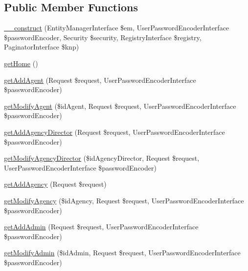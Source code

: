 \subsection*{Public Member Functions}
\begin{DoxyCompactItemize}
\item 
\mbox{\hyperlink{class_app_1_1_controller_1_1_back_office_controller_a6d26388f23c19aa542ee973f05763cd3}{\+\_\+\+\_\+construct}} (Entity\+Manager\+Interface \$em, User\+Password\+Encoder\+Interface \$password\+Encoder, Security \$security, Registry\+Interface \$registry, Paginator\+Interface \$knp)
\item 
\mbox{\hyperlink{class_app_1_1_controller_1_1_back_office_controller_aaff2f32ce95b0fc779c6bf0a4cb951de}{get\+Home}} ()
\item 
\mbox{\hyperlink{class_app_1_1_controller_1_1_back_office_controller_a1a5175895b31748239853b941fed04c0}{get\+Add\+Agent}} (Request \$request, User\+Password\+Encoder\+Interface \$password\+Encoder)
\item 
\mbox{\hyperlink{class_app_1_1_controller_1_1_back_office_controller_a881d008fb93ae52c44c83d0e17bebad2}{get\+Modify\+Agent}} (\$id\+Agent, Request \$request, User\+Password\+Encoder\+Interface \$password\+Encoder)
\item 
\mbox{\hyperlink{class_app_1_1_controller_1_1_back_office_controller_adfd1554df38c8420992410072cb7caa9}{get\+Add\+Agency\+Director}} (Request \$request, User\+Password\+Encoder\+Interface \$password\+Encoder)
\item 
\mbox{\hyperlink{class_app_1_1_controller_1_1_back_office_controller_aab2fbdfcf8f4824388222c179cd0e7eb}{get\+Modify\+Agency\+Director}} (\$id\+Agency\+Director, Request \$request, User\+Password\+Encoder\+Interface \$password\+Encoder)
\item 
\mbox{\hyperlink{class_app_1_1_controller_1_1_back_office_controller_a855477d6bb72b17c3ac314beb6307131}{get\+Add\+Agency}} (Request \$request)
\item 
\mbox{\hyperlink{class_app_1_1_controller_1_1_back_office_controller_ab742965dc10c09f94b092cec8f2655ff}{get\+Modify\+Agency}} (\$id\+Agency, Request \$request, User\+Password\+Encoder\+Interface \$password\+Encoder)
\item 
\mbox{\hyperlink{class_app_1_1_controller_1_1_back_office_controller_a2a7e4b7299741c749c9bfea17150d109}{get\+Add\+Admin}} (Request \$request, User\+Password\+Encoder\+Interface \$password\+Encoder)
\item 
\mbox{\hyperlink{class_app_1_1_controller_1_1_back_office_controller_af14856e06c0deaa21187ff550dc067e8}{get\+Modify\+Admin}} (\$id\+Admin, Request \$request, User\+Password\+Encoder\+Interface \$password\+Encoder)

\end{DoxyCompactItemize}
